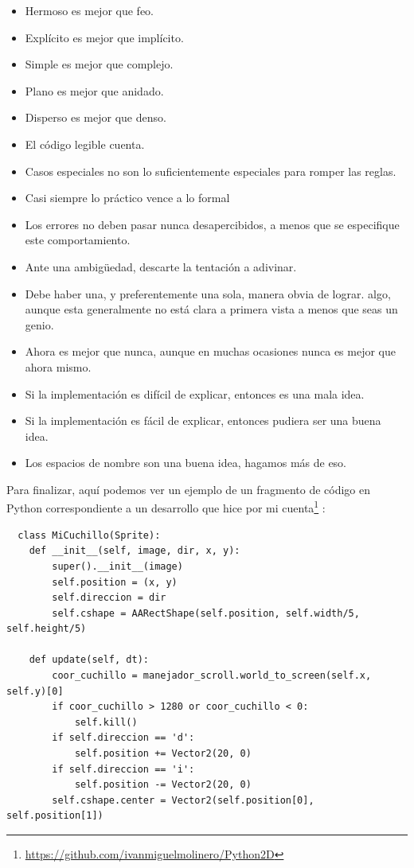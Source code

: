 \documentclass[a4paper, 12pt]{book}
\begin{document}
 \begin{itemize}
 	\item Hermoso es mejor que feo.
	\item Explícito es mejor que implícito.
 	\item Simple es mejor que complejo.
 	\item Plano es mejor que anidado.
 	\item Disperso es mejor que denso.
 	\item El código legible cuenta.
	\item Casos especiales no son lo suficientemente 	especiales para romper las reglas.
	\item Casi siempre lo práctico vence a lo formal
	\item Los errores no deben pasar nunca desapercibidos, a menos que se
especifique este comportamiento.
	\item Ante una ambigüedad, descarte la tentación a adivinar.
	\item Debe haber una, y preferentemente una sola, manera obvia de lograr.
algo, aunque esta generalmente no está clara a primera vista a menos
que seas un genio.
	\item Ahora es mejor que nunca, aunque en muchas ocasiones nunca es
mejor que ahora mismo.
	\item Si la implementación es difícil de explicar, entonces es una mala idea.
	\item Si la implementación es fácil de explicar, entonces pudiera ser una
buena idea.
	\item Los espacios de nombre son una buena idea, hagamos más de eso.
 \end{itemize}
 
 Para finalizar, aquí podemos ver un ejemplo de un fragmento de código en Python correspondiente a un desarrollo que hice por mi cuenta\footnote{\url{https://github.com/ivanmiguelmolinero/Python2D}} : 
 
 {\footnotesize
\begin{verbatim}
  class MiCuchillo(Sprite):
    def __init__(self, image, dir, x, y):
        super().__init__(image)
        self.position = (x, y)
        self.direccion = dir
        self.cshape = AARectShape(self.position, self.width/5, self.height/5)

    def update(self, dt):
        coor_cuchillo = manejador_scroll.world_to_screen(self.x, self.y)[0]
        if coor_cuchillo > 1280 or coor_cuchillo < 0:
            self.kill()
        if self.direccion == 'd':
            self.position += Vector2(20, 0)
        if self.direccion == 'i':
            self.position -= Vector2(20, 0)
        self.cshape.center = Vector2(self.position[0], self.position[1])
\end{verbatim}
}
\end{document}

